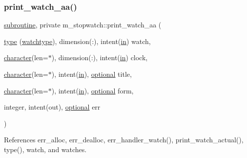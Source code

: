 \subsubsection{\texorpdfstring{print\+\_\+watch\+\_\+aa()}{print\_watch\_aa()}}
{\footnotesize\ttfamily \hyperlink{M__stopwatch_83_8txt_acfbcff50169d691ff02d4a123ed70482}{subroutine}, private m\+\_\+stopwatch\+::print\+\_\+watch\+\_\+aa (\begin{DoxyParamCaption}\item[{\hyperlink{stop__watch_83_8txt_a70f0ead91c32e25323c03265aa302c1c}{type} (\hyperlink{structm__stopwatch_1_1watchtype}{watchtype}), dimension(\+:), intent(\hyperlink{M__journal_83_8txt_afce72651d1eed785a2132bee863b2f38}{in})}]{watch,  }\item[{\hyperlink{option__stopwatch_83_8txt_abd4b21fbbd175834027b5224bfe97e66}{character}(len=$\ast$), dimension(\+:), intent(\hyperlink{M__journal_83_8txt_afce72651d1eed785a2132bee863b2f38}{in})}]{clock,  }\item[{\hyperlink{option__stopwatch_83_8txt_abd4b21fbbd175834027b5224bfe97e66}{character}(len=$\ast$), intent(\hyperlink{M__journal_83_8txt_afce72651d1eed785a2132bee863b2f38}{in}), \hyperlink{option__stopwatch_83_8txt_aa4ece75e7acf58a4843f70fe18c3ade5}{optional}}]{title,  }\item[{\hyperlink{option__stopwatch_83_8txt_abd4b21fbbd175834027b5224bfe97e66}{character}(len=$\ast$), intent(\hyperlink{M__journal_83_8txt_afce72651d1eed785a2132bee863b2f38}{in}), \hyperlink{option__stopwatch_83_8txt_aa4ece75e7acf58a4843f70fe18c3ade5}{optional}}]{form,  }\item[{integer, intent(out), \hyperlink{option__stopwatch_83_8txt_aa4ece75e7acf58a4843f70fe18c3ade5}{optional}}]{err }\end{DoxyParamCaption})\hspace{0.3cm}{\ttfamily [private]}}



References err\+\_\+alloc, err\+\_\+dealloc, err\+\_\+handler\+\_\+watch(), print\+\_\+watch\+\_\+actual(), type(), watch, and watches.


